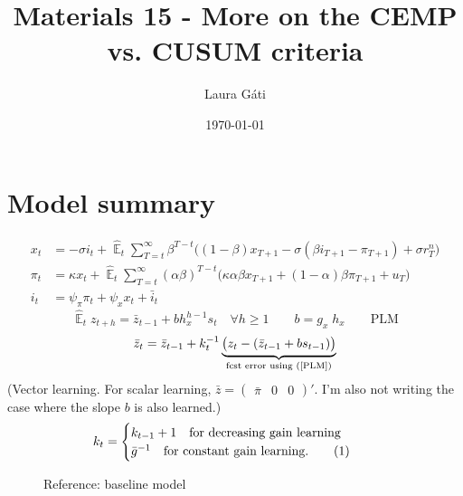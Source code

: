 \documentclass[11pt]{article}
\def \myFigPath {../figures/}
\renewcommand{\[}{\begin{equation}}
\renewcommand{\]}{\end{equation}}
\DeclareMathOperator{\E}{\mathbb{E}}
\def\myAdjustableFigScale{0.14}
\newcommand\numberthis{\addtocounter{equation}{1}\tag{\theequation}} %
\begin{document}
\linespread{1.0}

\title{Materials 15 - More on the CEMP vs. CUSUM criteria}
\author{Laura G\'ati} 
\date{\today}
\maketitle


\tableofcontents


\newpage
\section{Model summary}
\begin{align}
x_t &=  -\sigma i_t +\hat{\E}_t \sum_{T=t}^{\infty} \beta^{T-t }\big( (1-\beta)x_{T+1} - \sigma(\beta i_{T+1} - \pi_{T+1}) +\sigma r_T^n \big)  \label{prestons18}  \\
\pi_t &= \kappa x_t +\hat{\E}_t \sum_{T=t}^{\infty} (\alpha\beta)^{T-t }\big( \kappa \alpha \beta x_{T+1} + (1-\alpha)\beta \pi_{T+1} + u_T\big) \label{prestons19}  \\
i_t &= \psi_{\pi}\pi_t + \psi_{x} x_t  + \bar{i}_t \label{TR}
\end{align}
\begin{equation}
\hat{\E}_t z_{t+h} =  \bar{z}_{t-1} + bh_x^{h-1}s_t  \quad \forall h\geq 1 \quad \quad b = g_x\; h_x \quad \quad \text{PLM} \label{PLM}
\end{equation}
\begin{equation}
\bar{z}_{t} = \bar{z}_{t-1} +k_t^{-1}\underbrace{\big(z_{t} -(\bar{z}_{t-1}+bs_{t-1}) \big)}_{\text{fcst error using (\ref{PLM})} } 
\end{equation}
(Vector learning. For scalar learning, $\bar{z}= \begin{pmatrix} \bar{\pi} & 0 & 0\end{pmatrix}' $. I'm also not writing the case where the slope $b$ is also learned.)
 \begin{align*}
k_t & = \begin{cases} k_{t-1}+1 \quad \text{for decreasing gain learning}  \\ \bar{g}^{-1}  \quad \text{for constant gain learning.}\numberthis
\end{cases} 
\end{align*}

\begin{figure}[h!]
\caption{Reference: baseline model}
\end{figure}
\end{document}
